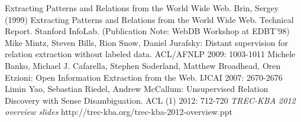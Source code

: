 \begin{thebibliography}{1}
 Extracting Patterns and Relations from the World Wide Web. Brin, Sergey (1999) Extracting Patterns and Relations from the World Wide Web. Technical Report. Stanford InfoLab. (Publication Note: WebDB Workshop at EDBT'98)
 Mike Mintz, Steven Bills, Rion Snow, Daniel Jurafsky: Distant supervision for relation extraction without labeled data. ACL/AFNLP 2009: 1003-1011   
 Michele Banko, Michael J. Cafarella, Stephen Soderland, Matthew Broadhead, Oren Etzioni: Open Information Extraction from the Web. IJCAI 2007: 2670-2676
 Limin Yao, Sebastian Riedel, Andrew McCallum: Unsupervised Relation Discovery with Sense Disambiguation. ACL (1) 2012: 712-720  
 {\em TREC-KBA 2012 overview slides} http://trec-kba.org/trec-kba-2012-overview.ppt
\end{thebibliography}
